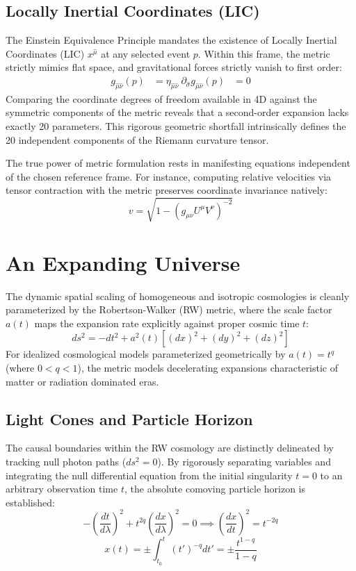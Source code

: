 \documentclass[11pt, a4paper]{report}
\begin{document}
\subsection*{Locally Inertial Coordinates (LIC)}
The Einstein Equivalence Principle mandates the existence of Locally Inertial Coordinates (LIC) $x^{\hat{\mu}}$ at any selected event $p$. Within this frame, the metric strictly mimics flat space, and gravitational forces strictly vanish to first order:
\begin{align} g_{\hat{\mu}\hat{\nu}}(p) &= \eta_{\hat{\mu}\hat{\nu}} \ \partial_{\hat{\sigma}} g_{\hat{\mu}\hat{\nu}}(p) &= 0 \end{align}
Comparing the coordinate degrees of freedom available in 4D against the symmetric components of the metric reveals that a second-order expansion lacks exactly 20 parameters. This rigorous geometric shortfall intrinsically defines the 20 independent components of the Riemann curvature tensor.

The true power of metric formulation rests in manifesting equations independent of the chosen reference frame. For instance, computing relative velocities via tensor contraction with the metric preserves coordinate invariance natively:
\begin{equation} v = \sqrt{1 - (g_{\mu\nu} U^\mu V^\nu)^{-2}} \end{equation}

\section{An Expanding Universe}
The dynamic spatial scaling of homogeneous and isotropic cosmologies is cleanly parameterized by the Robertson-Walker (RW) metric, where the scale factor $a(t)$ maps the expansion rate explicitly against proper cosmic time $t$:
\begin{equation}\label{eq:rw-metric} ds^2 = -dt^2 + a^2(t)[(dx)^2 + (dy)^2 + (dz)^2] \end{equation}
For idealized cosmological models parameterized geometrically by $a(t) = t^q$ (where $0 < q < 1$), the metric models decelerating expansions characteristic of matter or radiation dominated eras.

\subsection*{Light Cones and Particle Horizon}
The causal boundaries within the RW cosmology are distinctly delineated by tracking null photon paths ($ds^2 = 0$). By rigorously separating variables and integrating the null differential equation from the initial singularity $t=0$ to an arbitrary observation time $t$, the absolute comoving particle horizon is established:
\begin{equation} -\left(\frac{dt}{d\lambda}\right)^2 + t^{2q} \left(\frac{dx}{d\lambda}\right)^2 = 0 \implies \left(\frac{dx}{dt}\right)^2 = t^{-2q} \end{equation}
\begin{equation} x(t) = \pm \int_{t_0}^{t} (t')^{-q} dt' = \pm \frac{t^{1-q}}{1-q} \end{equation}
\end{document}
